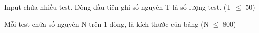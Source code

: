 Input chứa nhiều test. Dòng đầu tiên ghi số nguyên T là số lượng test. (T $\le$ 50)

Mỗi test chứa số nguyên N trên 1 dòng, là kích thước của bảng (N $\le$ 800)

\